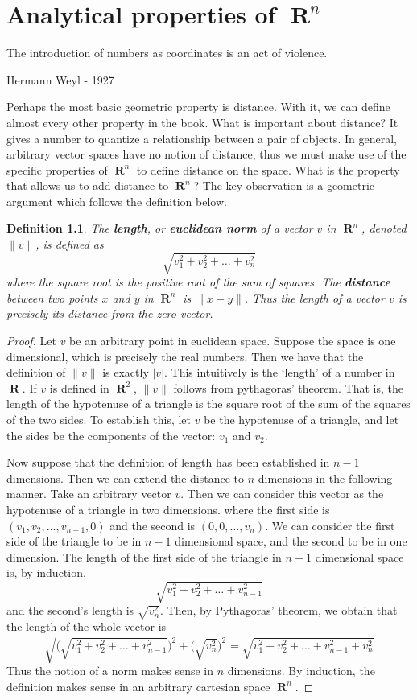\documentclass{report}
\newtheorem{definition}{Definition}
\DeclareMathOperator{\real}{\mathbf{R}}
\begin{document}
\chapter{Analytical properties of $\real^n$}

\epigraph{The introduction of numbers as coordinates is an act of violence.}{Hermann Weyl - 1927}

Perhaps the most basic geometric property is distance. With it, we can define almost every other property in the book. What is important about distance? It gives a number to quantize a relationship between a pair of objects. In general, arbitrary vector spaces have no notion of distance, thus we must make use of the specific properties of $\real^n$ to define distance on the space. What is the property that allows us to add distance to $\real^n$? The key observation is a geometric argument which follows the definition below.

\begin{definition}
  The {\bf length}, or {\bf euclidean norm} of a vector $v$ in $\real^n$, denoted $\|v\|$, is defined as
  \[ \sqrt{v_1^2 + v_2^2 + \dots + v_n^2} \]
  where the square root is the positive root of the sum of squares. The {\bf distance} between two points $x$ and $y$ in $\real^n$ is $\| x - y \|$. Thus the length of a vector $v$ is precisely its distance from the zero vector.
\end{definition}
\begin{proof}
  Let $v$ be an arbitrary point in euclidean space. Suppose the space is one dimensional, which is precisely the real numbers. Then we have that the definition of $\|v\|$ is exactly $|v|$. This intuitively is the `length' of a number in $\real$. If $v$ is defined in $\real^2$, $\|v\|$ follows from pythagoras' theorem. That is, the length of the hypotenuse of a triangle is the square root of the sum of the squares of the two sides. To establish this, let $v$ be the hypotenuse of a triangle, and let the sides be the components of the vector: $v_1$ and $v_2$.

  Now suppose that the definition of length has been established in $n-1$ dimensions. Then we can extend the distance to $n$ dimensions in the following manner. Take an arbitrary vector $v$. Then we can consider this vector as the hypotenuse of a triangle in two dimensions. where the first side is $(v_1,v_2,\dots,v_{n-1},0)$ and the second is $(0,0,\dots,v_n)$. We can consider the first side of the triangle to be in $n-1$ dimensional space, and the second to be in one dimension. The length of the first side of the triangle in $n-1$ dimensional space is, by induction,
  \[ \sqrt{v_1^2 + v_2^2 + \dots + v_{n-1}^2} \]
  and the second's length is $\sqrt{v_n^2}$. Then, by Pythagoras' theorem, we obtain that the length of the whole vector is
  \[ \sqrt{\bigg(\sqrt{v_1^2 + v_2^2 + \dots + v_{n-1}^2}\bigg)^2 + \bigg(\sqrt{v_n^2}\bigg)^2}
        = \sqrt{v_1^2 + v_2^2 + \dots + v_{n-1}^2 + v_n^2} \]
  Thus the notion of a norm makes sense in $n$ dimensions. By induction, the definition makes sense in an arbitrary cartesian space $\real^n$.
\end{proof}
\end{document}
